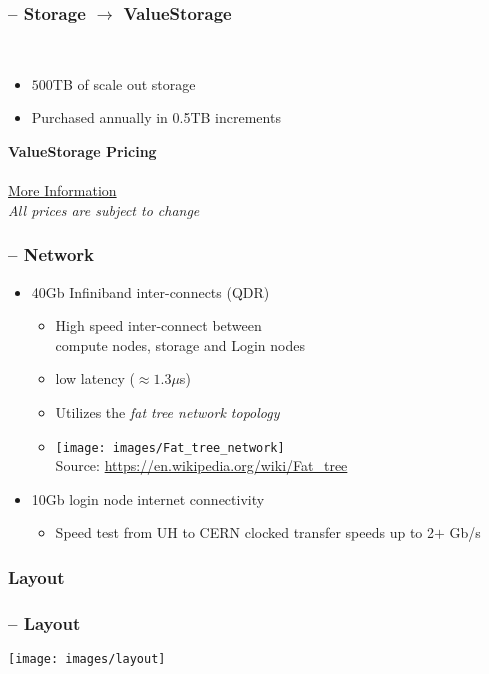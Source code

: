 \begin{frame}
	\frametitle{{\craycs} -- Storage $\rightarrow$ ValueStorage}
        ~\\
	\begin{itemize}
		\item $500$TB of scale out storage
		\item Purchased annually in 0.5TB increments 
	\end{itemize}
	\btVFill

	\begin{center}
	\textbf{ValueStorage Pricing}~\\ 
		~\\ \href{http://www.hawaii.edu/its/value-storage-pricing/}{More Information}
		~\\	{\footnotesize \emph{All prices are subject to change}}
	\end{center}
\end{frame}


\begin{frame}
	\frametitle{{\craycs} -- Network}
	\begin{itemize}
		\item 40Gb Infiniband inter-connects (QDR)
		\begin{itemize}
			\item High speed inter-connect between~\\compute nodes, {\lustre} storage and Login nodes
                        \item low latency ($\approx1.3\mu$s)
			\item Utilizes the \emph{fat tree network topology}
			\item[] \texttt{[image: images/Fat\_tree\_network]} \\[-1ex] {\fontsize{3}{4} \selectfont Source: \url{https://en.wikipedia.org/wiki/Fat_tree} } 		
		\end{itemize}
		\item 10Gb login node internet connectivity
		\begin{itemize}
			\item Speed test from UH to CERN clocked transfer speeds up to 2$+$ Gb/s
		\end{itemize}	
	\end{itemize}
\end{frame}

\subsubsection{Layout}
\begin{frame}
	\frametitle{{\craycs} -- Layout}
	\texttt{[image: images/layout]}
\end{frame}

